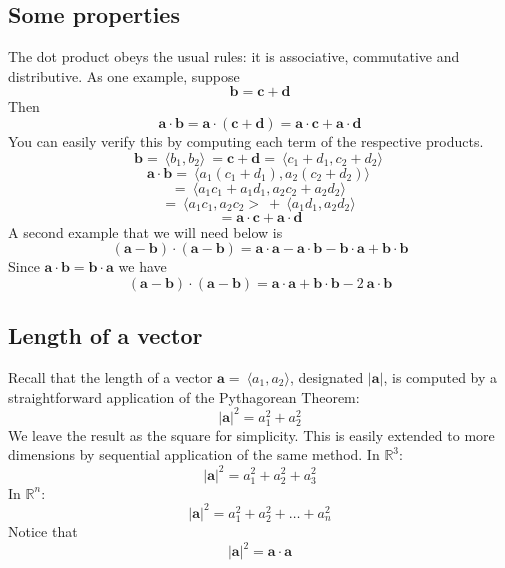 \documentclass[11pt, oneside]{report}   	%
\begin{document}
\subsection*{Some properties}
The dot product obeys the usual rules:  it is associative, commutative and distributive.  As one example, suppose
\[ \mathbf{b} = \mathbf{c} + \mathbf{d} \]
Then 
\[  \mathbf{a} \cdot \mathbf{b} =  \mathbf{a} \cdot ( \mathbf{c} + \mathbf{d}) = \mathbf{a} \cdot \mathbf{c} + \mathbf{a} \cdot \mathbf{d} \]
You can easily verify this by computing each term of the respective products.
\[ \mathbf{b} = \ \langle b_1,b_2 \rangle \ = \mathbf{c} + \mathbf{d} = \ \langle c_1+d_1,c_2+d_2 \rangle \ \]  
\[  \mathbf{a} \cdot \mathbf{b} = \ \langle a_1(c_1+d_1),a_2(c_2+d_2) \rangle \ \]  
\[ =  \ \langle a_1 c_1+a_1 d_1, a_2 c_2+ a_2 d_2 \rangle \ \]
\[ =  \ \langle a_1 c_1,a_2 c_2> \ + \ \langle a_1 d_1 , a_2 d_2 \rangle \ \]
\[ = \mathbf{a} \cdot \mathbf{c} + \mathbf{a} \cdot \mathbf{d} \]
A second example that we will need below is
\[ ( \mathbf{a} -  \mathbf{b}) \cdot ( \mathbf{a} -  \mathbf{b}) =  \mathbf{a} \cdot \mathbf{a} -  \mathbf{a} \cdot \mathbf{b} -  \mathbf{b} \cdot \mathbf{a} +  \mathbf{b} \cdot \mathbf{b}   \]
Since $\mathbf{a} \cdot \mathbf{b}  = \mathbf{b} \cdot \mathbf{a}$ we have
\[ ( \mathbf{a} -  \mathbf{b}) \cdot ( \mathbf{a} -  \mathbf{b}) =  \mathbf{a} \cdot \mathbf{a} +  \mathbf{b} \cdot \mathbf{b}  - 2 \ \mathbf{a} \cdot \mathbf{b}  \]

\subsection*{Length of a vector}
Recall that the length of a vector $\mathbf{a} = \ \langle a_1,a_2 \rangle $, designated $|\mathbf{a}|$, is computed by a straightforward application of the Pythagorean Theorem:
\[ |\mathbf{a}|^2 = a_1^2 + a_2^2 \]
We leave the result as the square for simplicity.  This is easily extended to more dimensions by sequential application of the same method.  In $\mathbb{R}^3$:
\[ |\mathbf{a}|^2 = a_1^2 + a_2^2 + a_3^2 \]
In $\mathbb{R}^n$:
\[ |\mathbf{a}|^2 = a_1^2 + a_2^2 + \dots + a_n^2 \]
Notice that
\[ |\mathbf{a}|^2 = \mathbf{a} \cdot \mathbf{a} \]
\end{document}
